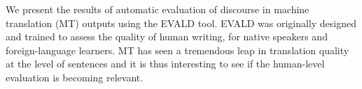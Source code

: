 We present the results of automatic evaluation of discourse in machine translation (MT) outputs using the EVALD tool. EVALD was originally designed and trained to assess the quality of human writing, for native speakers and foreign-language learners. MT has seen a tremendous leap in translation quality at the level of sentences and it is thus interesting to see if the human-level evaluation is becoming relevant.

